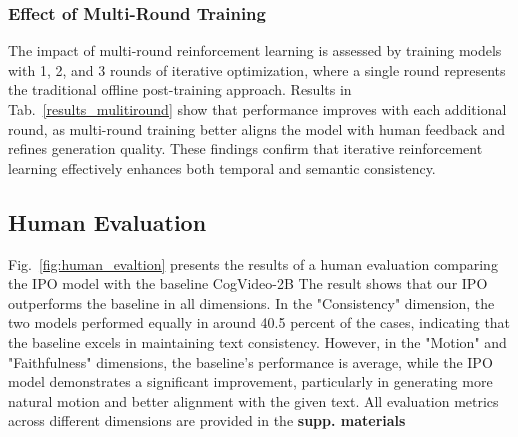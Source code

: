 
\subsubsection{Effect of Multi-Round Training}
The impact of multi-round reinforcement learning is assessed by training models with 1, 2, and 3 rounds of iterative optimization, where a single round represents the traditional offline post-training approach. Results in Tab.~\ref{results_mulitiround} show that performance improves with each additional round, as multi-round training better aligns the model with human feedback and refines generation quality. These findings confirm that iterative reinforcement learning effectively enhances both temporal and semantic consistency.




\subsection{Human Evaluation}
Fig.~\ref{fig:human_evaltion} presents the results of a human evaluation comparing the IPO model with the baseline CogVideo-2B
The result shows that our IPO outperforms the baseline in all dimensions. 
In the "Consistency" dimension, the two models performed equally in around 40.5 percent of the cases, indicating that the baseline excels in maintaining text consistency. However, in the "Motion" and "Faithfulness" dimensions, the baseline's performance is average, while the IPO model demonstrates a significant improvement, particularly in generating more natural motion and better alignment with the given text. All evaluation metrics across different dimensions are provided in the \textbf{supp. materials}





% 






